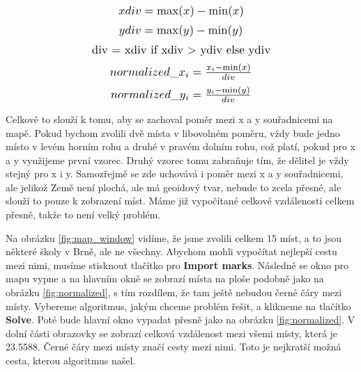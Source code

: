     \begin{equation*}
    \scalebox{1.2}{$xdiv = \max (x)-\min (x)$}
    \end{equation*}
    \begin{equation*}
    \scalebox{1.2}{$ydiv = \max (y)-\min (y)$}
    \end{equation*}
    \begin{equation*}
    \scalebox{1.2}{div = xdiv if xdiv > ydiv else ydiv}
    \end{equation*}
    \begin{equation*}
    \scalebox{1.2}{$normalized\_x_i=\frac{x_i-\min (x)}{div}$}
    \end{equation*}
    \begin{equation*}
    \scalebox{1.2}{$normalized\_y_i=\frac{y_i-\min (y)}{div}$}
    \end{equation*}

Celkově to slouží k tomu, aby se zachoval poměr mezi x a y souřadnicemi na mapě. Pokud bychom zvolili dvě místa v libovolném poměru, vždy bude jedno místo v levém horním rohu a druhé v pravém dolním rohu, což platí, pokud pro x a y využijeme první vzorec. Druhý vzorec tomu zabraňuje tím, že dělitel je vždy stejný pro x i y. Samozřejmě se zde uchovává i poměr mezi x a y souřadnicemi, ale jelikož Země není plochá, ale má geoidový tvar, nebude to zcela přesné, ale slouží to pouze k zobrazení míst. Máme již vypočítané celkové vzdálenosti celkem přesně, takže to není velký problém.

Na obrázku \ref{fig:map_window} vidíme, že jsme zvolili celkem 15 míst, a to jsou některé školy v Brně, ale ne všechny. Abychom mohli vypočítat nejlepší cestu mezi nimi, musíme stisknout tlačítko pro \textbf{Import marks}. Následně se okno pro mapu vypne a na hlavním okně se zobrazí místa na ploše podobně jako na obrázku \ref{fig:normalized}, s tím rozdílem, že tam ještě nebudou černé čáry mezi místy. Vybereme algoritmus, jakým chceme problém řešit, a klikneme na tlačítko \textbf{Solve}. Poté bude hlavní okno vypadat přesně jako na obrázku \ref{fig:normalized}. V dolní části obrazovky se zobrazí celková vzdálenost mezi všemi místy, která je 23.5588. Černé čáry mezi místy značí cesty mezi nimi. Toto je nejkratší možná cesta, kterou algoritmus našel.


